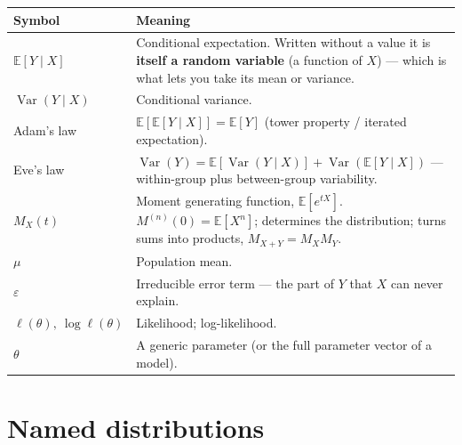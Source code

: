 \documentclass[10pt,letterpaper,onecolumn]{article}
\makeatletter
\newenvironment{symtab}
  {\begin{longtable}{@{}>{\raggedright\arraybackslash}p{0.26\textwidth}%
                       >{\raggedright\arraybackslash}p{0.70\textwidth}@{}}
   \toprule
   \textbf{Symbol} & \textbf{Meaning} \\
   \midrule
   \endhead
   \bottomrule
   \endfoot}
  {\end{longtable}}
\makeatother
\begin{document}
\begin{symtab}
$\mathbb{E}[Y \mid X]$ & Conditional expectation. Written without a value it is \textbf{itself a random variable} (a function of $X$) — which is what lets you take its mean or variance. \\
$\operatorname{Var}(Y \mid X)$ & Conditional variance. \\
Adam's law & $\mathbb{E}[\mathbb{E}[Y\mid X]] = \mathbb{E}[Y]$ (tower property / iterated expectation). \\
Eve's law & $\operatorname{Var}(Y) = \mathbb{E}[\operatorname{Var}(Y\mid X)] + \operatorname{Var}(\mathbb{E}[Y\mid X])$ — within-group plus between-group variability. \\
$M_X(t)$ & Moment generating function, $\mathbb{E}[e^{tX}]$. $M^{(n)}(0)=\mathbb{E}[X^n]$; determines the distribution; turns sums into products, $M_{X+Y}=M_X M_Y$. \\
$\mu$ & Population mean. \\
$\varepsilon$ & Irreducible error term — the part of $Y$ that $X$ can never explain. \\
$\ell(\theta),\ \log\ell(\theta)$ & Likelihood; log-likelihood. \\
$\theta$ & A generic parameter (or the full parameter vector of a model). \\
\end{symtab}

\section{Named distributions}
\label{sec:dists}
\end{document}
